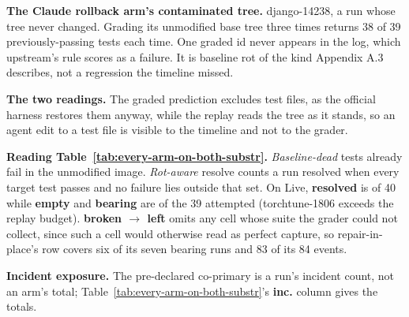 \documentclass{article}
\begin{document}
\textbf{The Claude rollback arm's contaminated tree.} django-14238, a run whose tree never changed. Grading its unmodified base tree three times returns 38 of 39 previously-passing tests each time. One graded id never appears in the log, which upstream's rule scores as a failure. It is baseline rot of the kind Appendix A.3 describes, not a regression the timeline missed.

\textbf{The two readings.} The graded prediction excludes test files, as the official harness restores them anyway, while the replay reads the tree as it stands, so an agent edit to a test file is visible to the timeline and not to the grader.

\textbf{Reading Table~\ref{tab:every-arm-on-both-substr}.} \emph{Baseline-dead} tests already fail in the unmodified image. \emph{Rot-aware} resolve counts a run resolved when every target test passes and no failure lies outside that set. On Live, \textbf{resolved} is of 40 while \textbf{empty} and \textbf{bearing} are of the 39 attempted (torchtune-1806 exceeds the replay budget). \textbf{broken $\rightarrow$ left} omits any cell whose suite the grader could not collect, since such a cell would otherwise read as perfect capture, so repair-in-place's row covers six of its seven bearing runs and 83 of its 84 events.

\textbf{Incident exposure.} The pre-declared co-primary is a run's incident count, not an arm's total; Table~\ref{tab:every-arm-on-both-substr}'s \textbf{inc.} column gives the totals.
\newpage

\end{document}
